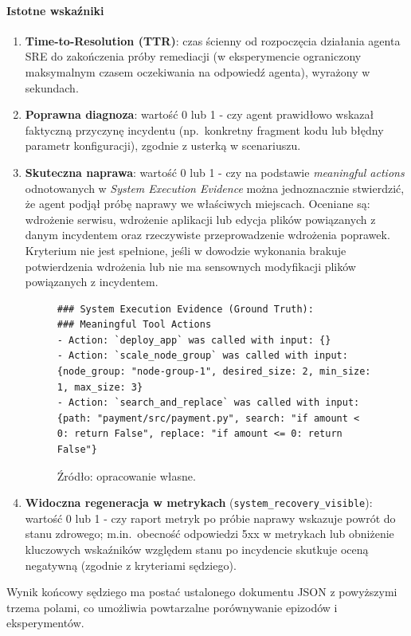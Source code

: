 \paragraph{Istotne wskaźniki}
\label{subsec:meaningful-indicators}
\begin{enumerate}
    \item \textbf{Time-to-Resolution (TTR)}: czas ścienny od rozpoczęcia działania agenta SRE do zakończenia próby remediacji (w eksperymencie ograniczony maksymalnym czasem oczekiwania na odpowiedź agenta), wyrażony w sekundach.
    \item \textbf{Poprawna diagnoza}: wartość 0 lub 1 - czy agent prawidłowo wskazał faktyczną przyczynę incydentu (np.\ konkretny fragment kodu lub błędny parametr konfiguracji), zgodnie z usterką w scenariuszu.
    \item \textbf{Skuteczna naprawa}: wartość 0 lub 1 - czy na podstawie \textit{meaningful actions} odnotowanych w \textit{System Execution Evidence} można jednoznacznie stwierdzić, że agent podjął próbę naprawy we właściwych miejscach. \newline Oceniane są: wdrożenie serwisu, wdrożenie aplikacji lub edycja plików powiązanych z danym incydentem oraz rzeczywiste przeprowadzenie wdrożenia poprawek. Kryterium nie jest spełnione, jeśli w dowodzie wykonania brakuje potwierdzenia wdrożenia lub nie ma sensownych modyfikacji plików powiązanych z incydentem.
   \begin{figure}[H]
    \centering
    \caption{Przykład fragmentu dowodu wykonania narzędzi w fazie auto-remediacji}
    \label{fig:evidence-prompt}
    \begin{lstlisting}[basicstyle=\footnotesize\ttfamily]
### System Execution Evidence (Ground Truth):
### Meaningful Tool Actions
- Action: `deploy_app` was called with input: {}
- Action: `scale_node_group` was called with input: {node_group: "node-group-1", desired_size: 2, min_size: 1, max_size: 3}
- Action: `search_and_replace` was called with input: {path: "payment/src/payment.py", search: "if amount < 0: return False", replace: "if amount <= 0: return False"}
\end{lstlisting}
    \caption*{\footnotesize Źródło: opracowanie własne.}
\end{figure}
   

    \item \textbf{Widoczna regeneracja w metrykach} (\texttt{system\_recovery\_visible}): wartość 0 lub 1 - czy raport metryk po próbie naprawy wskazuje powrót do stanu zdrowego; m.in.\ obecność odpowiedzi 5xx w metrykach lub obniżenie kluczowych wskaźników względem stanu po incydencie skutkuje oceną negatywną (zgodnie z kryteriami sędziego).
\end{enumerate}
Wynik końcowy sędziego ma postać ustalonego dokumentu JSON z powyższymi trzema polami, co umożliwia powtarzalne porównywanie epizodów i eksperymentów.